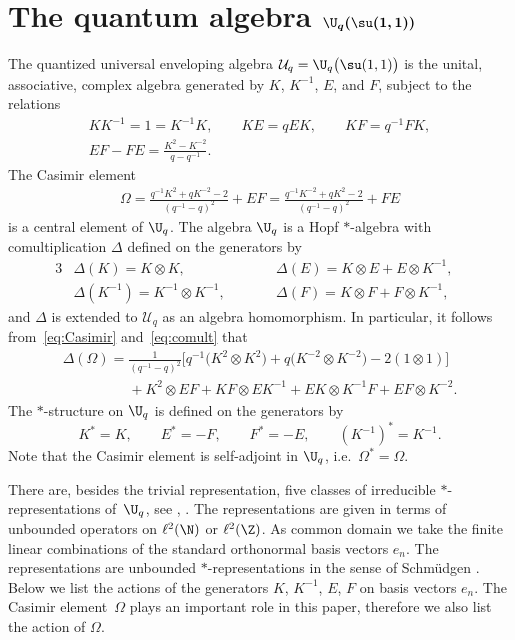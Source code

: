 \section[The quantum algebra $\U_q(\su(1,1))$]{The quantum algebra $\boldsymbol{\U_q(\su(1,1))}$} \label{sec:Uq}

The quantized universal enveloping algebra $\mathcal U_q = \U_q\big(\su(1,1)\big)$ is the unital, associative, complex algebra generated by $K$, $K^{-1}$, $E$, and $F$, subject to the relations
\begin{gather}
K K^{-1} = 1 = K^{-1}K, \qquad KE = qEK, \qquad KF= q^{-1}FK, \nonumber\\
 EF-FE =\frac{K^2-K^{-2}}{q-q^{-1}}.\label{eq:commutationrel}
\end{gather}
The Casimir element
\begin{gather} \label{eq:Casimir}
\Omega = \frac{q^{-1} K^2 +qK^{-2}-2}{(q^{-1}-q)^2} + EF= \frac{q^{-1}K^{-2}+qK^2-2}{(q^{-1}-q)^2} +FE
\end{gather}
is a central element of $\U_q$. The algebra
$\U_q$ is a Hopf $*$-algebra with comultiplication $\Delta$ def\/ined on the generators by
\begin{alignat}{3}
& \Delta(K) = K \otimes K,\qquad && \Delta(E)= K \otimes E + E \otimes K^{-1},& \nonumber\\
& \Delta(K^{-1}) = K^{-1} \otimes K^{-1},\qquad && \Delta(F) = K \otimes F + F \otimes K^{-1} ,& \label{eq:comult}
\end{alignat}
and $\Delta$ is extended to $\mathcal U_q$ as an algebra homomorphism. In particular, it follows from~\eqref{eq:Casimir} and~\eqref{eq:comult} that
\begin{gather}
\Delta(\Omega) = \frac{1}{(q^{-1}-q)^{2}} \big[ q^{-1}\big( K^2 \otimes K^2 \big)+ q
\big(K^{-2} \otimes K^{-2}\big) -2 (1\otimes 1) \big] \nonumber\\
\phantom{\Delta(\Omega) =}{} + K^2 \otimes EF +KF\otimes
EK^{-1} + EK \otimes K^{-1}F + EF \otimes K^{-2}.\label{eq:De(OM)}
\end{gather}
The $*$-structure on $\U_q$ is def\/ined on the generators by
\[
K^*=K, \qquad E^*=-F, \qquad F^* = -E, \qquad (K^{-1})^* = K^{-1}.
\]
Note that the Casimir element is self-adjoint in $\U_q$, i.e.~$\Omega^*=\Omega$.

There are, besides the trivial representation, f\/ive classes of irreducible $*$-representations of~$\U_q$, see \cite[Proposition~4]{MMNNSU}, \cite[Section~6]{BK93}. The representations are given in terms of unbounded operators on $\ell^2(\N)$ or $\ell^2(\Z)$. As common domain we take the f\/inite linear combinations of the standard orthonormal basis vectors $e_n$. The representations are unbounded $*$-representations in the sense of Schm\"udgen \cite[Def\/inition~8.1.9]{Sch}. Below we list the actions of the generators $K$, $K^{-1}$, $E$, $F$ on basis vectors $e_n$. The Casimir element~$\Omega$ plays an important role in this paper, therefore we also list the action of $\Omega$.

